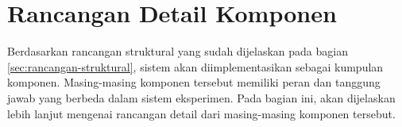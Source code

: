 \newpage
\section{Rancangan Detail Komponen}
\label{sec:detail-komponen}

Berdasarkan rancangan struktural yang sudah dijelaskan pada bagian \ref{sec:rancangan-struktural}, sistem akan diimplementasikan sebagai kumpulan komponen. Masing-masing komponen tersebut memiliki peran dan tanggung jawab yang berbeda dalam sistem eksperimen. Pada bagian ini, akan dijelaskan lebih lanjut mengenai rancangan detail dari masing-masing komponen tersebut.










